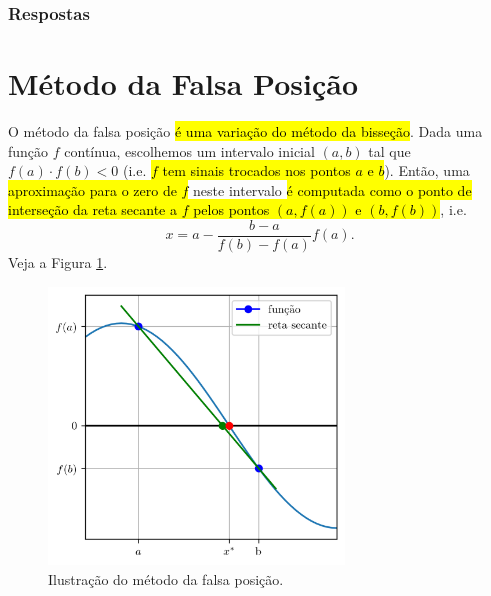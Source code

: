 \ifisbook
\subsubsection{Respostas}
\shipoutAnswer
\fi


\section{Método da Falsa Posição}\label{cap_eq1d_sec_falsapos}

O método da falsa posição \hl{é uma variação do método da bisseção}. Dada uma função $f$ contínua, escolhemos um intervalo inicial $(a, b)$ tal que $f(a)\cdot f(b) < 0$ (i.e. \hl{$f$ tem sinais trocados nos pontos $a$ e $b$}). Então, uma \hl{aproximação para o zero de $f$} neste intervalo \hl{é computada como o ponto de interseção da reta secante a $f$ pelos pontos $(a, f(a))$ e $(b, f(b))$}, i.e.
\begin{equation}
  x = a - \frac{b-a}{f(b)-f(a)}f(a).
\end{equation}
Veja a Figura \ref{cap_eq1d_sec_falsapos:fig:falsapos}.

\begin{figure}[H]
  \centering
  \includegraphics[width=0.7\textwidth]{./cap_eq1d/dados/fig_falsapos/fig}
  \caption{Ilustração do método da falsa posição.}
  \label{cap_eq1d_sec_falsapos:fig:falsapos}
\end{figure}

